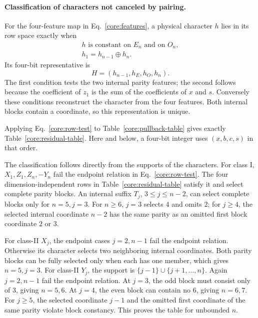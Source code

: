 \paragraph{Classification of characters not canceled by pairing.}
For the four-feature map in Eq.~\eqref{core:features}, a physical character $h$ lies in its row space exactly when
\begin{equation}
 \begin{gathered}
 h\text{ is constant on }E_n\text{ and on }O_n,\\
 h_1=h_{n-1}\oplus h_n.
 \end{gathered}
 \label{core:row-test}
\end{equation}
Its four-bit representative is
\[
 H=(h_{n-1},h_E,h_O,h_n).
\]
The first condition tests the two internal parity features; the second follows because the coefficient of $z_1$ is the sum of the coefficients of $x$ and $s$. Conversely these conditions reconstruct the character from the four features. Both internal blocks contain a coordinate, so this representation is unique.

Applying Eq.~\eqref{core:row-test} to Table~\ref{core:pullback-table} gives exactly Table~\ref{core:residual-table}. Here and below, a four-bit integer uses $(x,b,c,s)$ in that order.



The classification follows directly from the supports of the characters. For class I, $X_1,Z_1,Z_n,-Y_n$ fail the endpoint relation in Eq.~\eqref{core:row-test}. The four dimension-independent rows in Table~\ref{core:residual-table} satisfy it and select complete parity blocks. An internal suffix $T_j$, $3\le j\le n-2$, can select complete blocks only for $n=5,j=3$. For $n\ge6$, $j=3$ selects $4$ and omits $2$; for $j\ge4$, the selected internal coordinate $n-2$ has the same parity as an omitted first block coordinate $2$ or $3$.

For class-II $X_j$, the endpoint cases $j=2,n-1$ fail the endpoint relation. Otherwise its character selects two neighboring internal coordinates. Both parity blocks can be fully selected only when each has one member, which gives $n=5,j=3$. For class-II $Y_j$, the support is $\{j-1\}\cup\{j+1,\ldots,n\}$. Again $j=2,n-1$ fail the endpoint relation. At $j=3$, the odd block must consist only of $3$, giving $n=5,6$. At $j=4$, the even block can contain no $6$, giving $n=6,7$. For $j\ge5$, the selected coordinate $j-1$ and the omitted first coordinate of the same parity violate block constancy. This proves the table for unbounded $n$.


